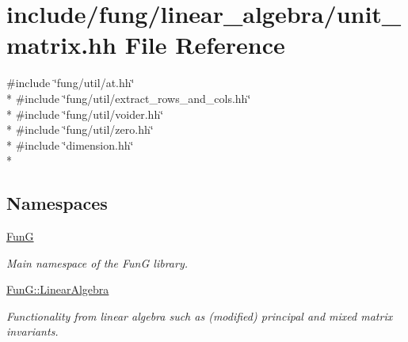 \hypertarget{unit__matrix_8hh}{\section{include/fung/linear\-\_\-algebra/unit\-\_\-matrix.hh File Reference}
\label{unit__matrix_8hh}
}
{\ttfamily \#include \char`\"{}fung/util/at.\-hh\char`\"{}}\\*
{\ttfamily \#include \char`\"{}fung/util/extract\-\_\-rows\-\_\-and\-\_\-cols.\-hh\char`\"{}}\\*
{\ttfamily \#include \char`\"{}fung/util/voider.\-hh\char`\"{}}\\*
{\ttfamily \#include \char`\"{}fung/util/zero.\-hh\char`\"{}}\\*
{\ttfamily \#include \char`\"{}dimension.\-hh\char`\"{}}\\*
\subsection*{Namespaces}
\begin{DoxyCompactItemize}
\item 
\hyperlink{namespaceFunG}{Fun\-G}
\begin{DoxyCompactList}\small\item\em Main namespace of the Fun\-G library. \end{DoxyCompactList}\item 
\hyperlink{namespaceFunG_1_1LinearAlgebra}{Fun\-G\-::\-Linear\-Algebra}
\begin{DoxyCompactList}\small\item\em Functionality from linear algebra such as (modified) principal and mixed matrix invariants. \end{DoxyCompactList}\end{DoxyCompactItemize}
